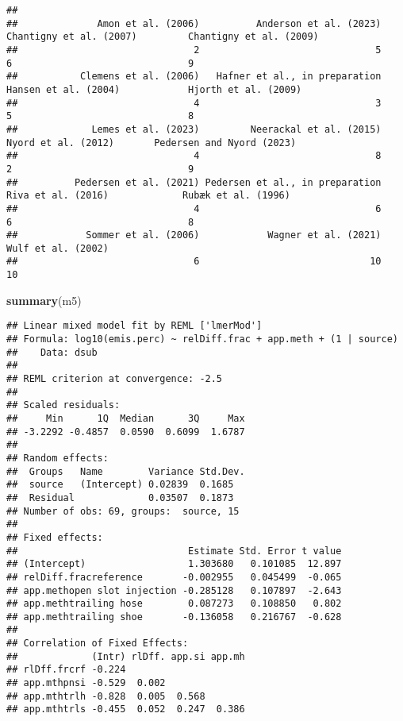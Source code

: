 \documentclass[
]{article}
\newenvironment{Shaded}{\begin{snugshade}}{\end{snugshade}}
\newcommand{\FunctionTok}[1]{\textcolor[rgb]{0.13,0.29,0.53}{\textbf{#1}}}
\newcommand{\NormalTok}[1]{#1}
\begin{document}
\begin{verbatim}
## 
##              Amon et al. (2006)          Anderson et al. (2023)         Chantigny et al. (2007)         Chantigny et al. (2009) 
##                               2                               5                               6                               9 
##           Clemens et al. (2006)   Hafner et al., in preparation            Hansen et al. (2004)            Hjorth et al. (2009) 
##                               4                               3                               5                               8 
##             Lemes et al. (2023)         Neerackal et al. (2015)             Nyord et al. (2012)       Pedersen and Nyord (2023) 
##                               4                               8                               2                               9 
##          Pedersen et al. (2021) Pedersen et al., in preparation              Riva et al. (2016)             Rubæk et al. (1996) 
##                               4                               6                               6                               8 
##            Sommer et al. (2006)            Wagner et al. (2021)              Wulf et al. (2002) 
##                               6                              10                              10
\end{verbatim}

\begin{Shaded}
\begin{Highlighting}[]
\FunctionTok{summary}\NormalTok{(m5)}
\end{Highlighting}
\end{Shaded}

\begin{verbatim}
## Linear mixed model fit by REML ['lmerMod']
## Formula: log10(emis.perc) ~ relDiff.frac + app.meth + (1 | source)
##    Data: dsub
## 
## REML criterion at convergence: -2.5
## 
## Scaled residuals: 
##     Min      1Q  Median      3Q     Max 
## -3.2292 -0.4857  0.0590  0.6099  1.6787 
## 
## Random effects:
##  Groups   Name        Variance Std.Dev.
##  source   (Intercept) 0.02839  0.1685  
##  Residual             0.03507  0.1873  
## Number of obs: 69, groups:  source, 15
## 
## Fixed effects:
##                              Estimate Std. Error t value
## (Intercept)                  1.303680   0.101085  12.897
## relDiff.fracreference       -0.002955   0.045499  -0.065
## app.methopen slot injection -0.285128   0.107897  -2.643
## app.methtrailing hose        0.087273   0.108850   0.802
## app.methtrailing shoe       -0.136058   0.216767  -0.628
## 
## Correlation of Fixed Effects:
##             (Intr) rlDff. app.si app.mh
## rlDff.frcrf -0.224                     
## app.mthpnsi -0.529  0.002              
## app.mthtrlh -0.828  0.005  0.568       
## app.mthtrls -0.455  0.052  0.247  0.386
\end{verbatim}
\end{document}
